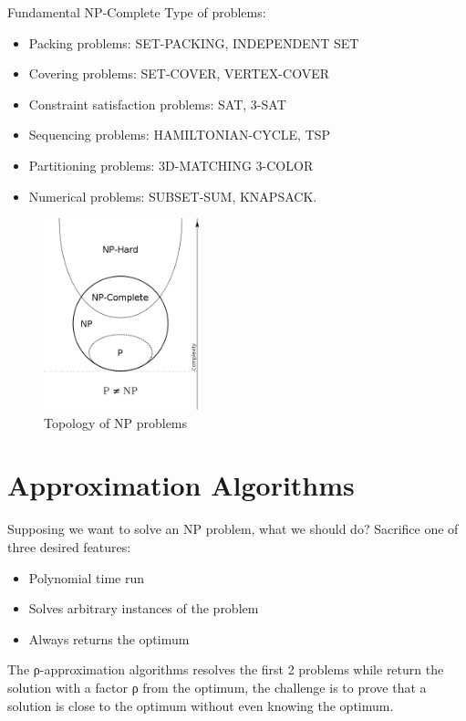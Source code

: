 \documentclass[11pt]{article}
\begin{document}
Fundamental NP-Complete Type of problems:
\begin{itemize}
\item{Packing problems: SET-PACKING, INDEPENDENT SET}
\item{Covering problems: SET-COVER, VERTEX-COVER}
\item{Constraint satisfaction problems: SAT, 3-SAT}
\item{Sequencing problems: HAMILTONIAN-CYCLE, TSP}
\item{Partitioning problems: 3D-MATCHING 3-COLOR}
\item{Numerical problems: SUBSET-SUM, KNAPSACK.}
\end{itemize}

\begin{figure}[H]
		\centering
		\includegraphics[width=0.4\textwidth ]{NPSet}
		\caption{Topology of NP problems}
\end{figure}

\clearpage

\section{Approximation Algorithms}
Supposing we want to solve an NP problem, what we should do? Sacrifice one of three desired features:

\begin{itemize}
\item{Polynomial time run}
\item{Solves arbitrary instances of the problem}
\item{Always returns the optimum}
\end{itemize}

The ρ-approximation algorithms resolves the first 2 problems while return the solution with a factor ρ from the optimum, the challenge is to prove that a solution is close to the optimum without even knowing the optimum.
\end{document}
